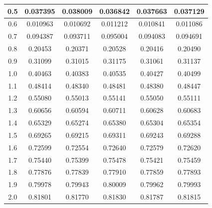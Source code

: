 \begin{table}
\begin{tabular}{| c | c | c | c | c | c |}
\hline
0.5 &  0.037395 &  0.038009 &  0.036842 &  0.037663 &  0.037129 \\
\hline
0.6 &  0.010963 &  0.010692 &  0.011212 &  0.010841 &  0.011086 \\
\hline
0.7 &  0.094387 &  0.093711 &  0.095004 &  0.094083 &  0.094691 \\
\hline
0.8 &  0.20453 &  0.20371 &  0.20528 &  0.20416 &  0.20490 \\
\hline
0.9 &  0.31099 &  0.31015 &  0.31175 &  0.31061 &  0.31137 \\
\hline
1.0 &  0.40463 &  0.40383 &  0.40535 &  0.40427 &  0.40499 \\
\hline
1.1 &  0.48414 &  0.48340 &  0.48481 &  0.48380 &  0.48447 \\
\hline
1.2 &  0.55080 &  0.55013 &  0.55141 &  0.55050 &  0.55111 \\
\hline
1.3 &  0.60656 &  0.60594 &  0.60711 &  0.60628 &  0.60683 \\
\hline
1.4 &  0.65329 &  0.65274 &  0.65380 &  0.65304 &  0.65354 \\
\hline
1.5 &  0.69265 &  0.69215 &  0.69311 &  0.69243 &  0.69288 \\
\hline
1.6 &  0.72599 &  0.72554 &  0.72640 &  0.72579 &  0.72620 \\
\hline
1.7 &  0.75440 &  0.75399 &  0.75478 &  0.75421 &  0.75459 \\
\hline
1.8 &  0.77876 &  0.77839 &  0.77910 &  0.77859 &  0.77893 \\
\hline
1.9 &  0.79978 &  0.79943 &  0.80009 &  0.79962 &  0.79993 \\
\hline
2.0 &  0.81801 &  0.81770 &  0.81830 &  0.81787 &  0.81815 \\
\hline
\end{tabular}
\label{numuSurvProbEffectError12}
\end{table}

\clearpage

